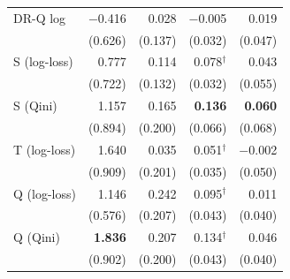 \begin{tabular}{l|rrrr}
DR-Q log & $-$0.416 & 0.028 & $-$0.005 & 0.019 \\
 & \scriptsize (0.626) & \scriptsize (0.137) & \scriptsize (0.032) & \scriptsize (0.047) \\[2pt]
\hline
S (log-loss) & 0.777 & 0.114 & 0.078$^\dagger$ & 0.043 \\
 & \scriptsize (0.722) & \scriptsize (0.132) & \scriptsize (0.032) & \scriptsize (0.055) \\[2pt]
S (Qini) & 1.157 & 0.165 & \textbf{0.136} & \textbf{0.060} \\
 & \scriptsize (0.894) & \scriptsize (0.200) & \scriptsize (0.066) & \scriptsize (0.068) \\[2pt]
T (log-loss) & 1.640 & 0.035 & 0.051$^\dagger$ & $-$0.002 \\
 & \scriptsize (0.909) & \scriptsize (0.201) & \scriptsize (0.035) & \scriptsize (0.050) \\[2pt]
Q (log-loss) & 1.146 & 0.242 & 0.095$^\dagger$ & 0.011 \\
 & \scriptsize (0.576) & \scriptsize (0.207) & \scriptsize (0.043) & \scriptsize (0.040) \\[2pt]
Q (Qini) & \textbf{1.836} & 0.207 & 0.134$^\dagger$ & 0.046 \\
 & \scriptsize (0.902) & \scriptsize (0.200) & \scriptsize (0.043) & \scriptsize (0.040) \\[2pt]
\hline
\end{tabular}

